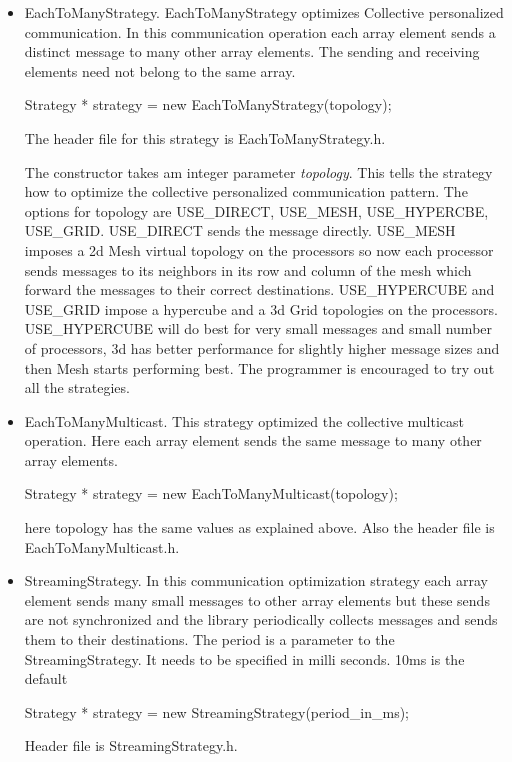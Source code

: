 \begin{itemize} 
\item EachToManyStrategy. EachToManyStrategy optimizes Collective 
personalized communication. In this communication operation each array
element sends a distinct message to many other array elements. The
sending and receiving elements need not belong to the same array.

Strategy * strategy = new EachToManyStrategy(topology);

The header file for this strategy is EachToManyStrategy.h.

The constructor takes am integer parameter {\em topology}. This tells
the strategy how to optimize the collective personalized communication
pattern. The options for topology are USE\_DIRECT, USE\_MESH,
USE\_HYPERCBE, USE\_GRID. USE\_DIRECT sends the message
directly. USE\_MESH imposes a 2d Mesh virtual topology on the
processors so now each processor sends messages to its neighbors in
its row and column of the mesh which forward the messages to their
correct destinations. USE\_HYPERCUBE and USE\_GRID impose a hypercube
and a 3d Grid topologies on the processors. USE\_HYPERCUBE will do
best for very small messages and small number of processors, 3d has
better performance for slightly higher message sizes and then Mesh
starts performing best. The programmer is encouraged to try out all
the strategies.

\item EachToManyMulticast. This strategy optimized the collective 
multicast operation. Here each array element sends the same message to
many other array elements.

Strategy * strategy = new EachToManyMulticast(topology);

here topology has the same values as explained above. Also the
header file is EachToManyMulticast.h.

\item StreamingStrategy. In this communication optimization strategy 
each array element sends many small messages to other array elements
but these sends are not synchronized and the library periodically
collects messages and sends them to their destinations. The period is
a parameter to the StreamingStrategy. It needs to be specified in
milli seconds. 10ms is the default

Strategy * strategy = new StreamingStrategy(period\_in\_ms);

Header file is StreamingStrategy.h.

\end{itemize}


